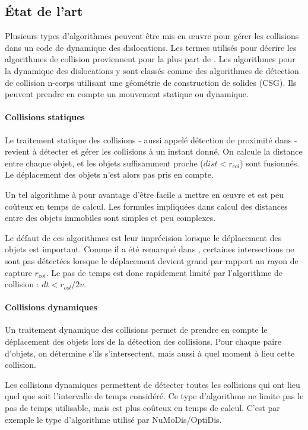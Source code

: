 \documentclass[11pt,class=article,float=false,crop=false]{standalone}
\begin{document}
\subsection{État de l'art}

Plusieurs types d'algorithmes peuvent être mis en œuvre pour gérer les collisions dans un code de dynamique des dislocations. Les termes utilisés pour décrire les algorithmes de collision proviennent pour la plus part de . Les algorithmes pour la dynamique des dislocations y sont classés comme des algorithmes de détection de collision n-corps utilisant une géométrie de construction de solides (CSG). Ils peuvent prendre en compte un mouvement statique ou dynamique.

\paragraph{Collisions statiques} 

Le traitement statique des collisions - aussi appelé détection de proximité dans  - revient à détecter et gérer les collisions à un instant donné. On calcule la distance entre chaque objet, et les objets suffisamment proche ($dist < r_{col}$) sont fusionnés. Le déplacement des objets n'est alors pas pris en compte.

Un tel algorithme à pour avantage d'être facile a mettre en œuvre et est peu coûteux en temps de calcul. Les formules impliquées dans calcul des distances entre des objets immobiles sont simples et peu complexes. 

Le défaut de ces algorithmes est leur imprécision lorsque le déplacement des objets est important. Comme il a été remarqué dans , certaines intersections ne sont pas détectées lorsque le déplacement devient grand par rapport au rayon de capture $r_{col}$. Le pas de temps est donc rapidement limité par l'algorithme de collision : $dt < r_{col}/2v$.

\paragraph{Collisions dynamiques}

Un traitement dynamique des collisions permet de prendre en compte le déplacement des objets lors de la détection des collisions. Pour chaque paire d'objets, on détermine s'ils s'intersectent, mais aussi à quel moment à lieu cette collision.

Les collisions dynamiques permettent de détecter toutes les collisions qui ont lieu quel que soit l'intervalle de temps considéré. Ce type d'algorithme ne limite pas le pas de temps utilisable, mais est plus coûteux en temps de calcul. C'est par exemple le type d'algorithme utilisé par NuMoDis/OptiDis. 
\end{document}
